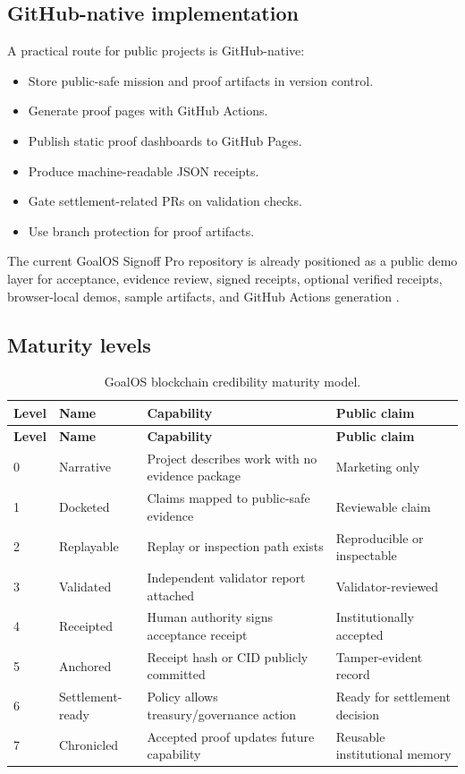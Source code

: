 \subsection{GitHub-native implementation}

A practical route for public projects is GitHub-native:

\begin{itemize}
  \item Store public-safe mission and proof artifacts in version control.
  \item Generate proof pages with GitHub Actions.
  \item Publish static proof dashboards to GitHub Pages.
  \item Produce machine-readable JSON receipts.
  \item Gate settlement-related PRs on validation checks.
  \item Use branch protection for proof artifacts.
\end{itemize}

The current GoalOS Signoff Pro repository is already positioned as a public demo layer for acceptance, evidence review, signed receipts, optional verified receipts, browser-local demos, sample artifacts, and GitHub Actions generation \citep{goalosRepo,goalosReadme}.

\subsection{Maturity levels}

\begin{longtable}{p{} p{} p{} p{}}
\caption{GoalOS blockchain credibility maturity model.}\label{tab:maturity}\\
\toprule
\textbf{Level} & \textbf{Name} & \textbf{Capability} & \textbf{Public claim}\\
\midrule
\endfirsthead
\toprule
\textbf{Level} & \textbf{Name} & \textbf{Capability} & \textbf{Public claim}\\
\midrule
\endhead
0 & Narrative & Project describes work with no evidence package & Marketing only \\
1 & Docketed & Claims mapped to public-safe evidence & Reviewable claim \\
2 & Replayable & Replay or inspection path exists & Reproducible or inspectable \\
3 & Validated & Independent validator report attached & Validator-reviewed \\
4 & Receipted & Human authority signs acceptance receipt & Institutionally accepted \\
5 & Anchored & Receipt hash or CID publicly committed & Tamper-evident record \\
6 & Settlement-ready & Policy allows treasury/governance action & Ready for settlement decision \\
7 & Chronicled & Accepted proof updates future capability & Reusable institutional memory \\
\bottomrule
\end{longtable}

